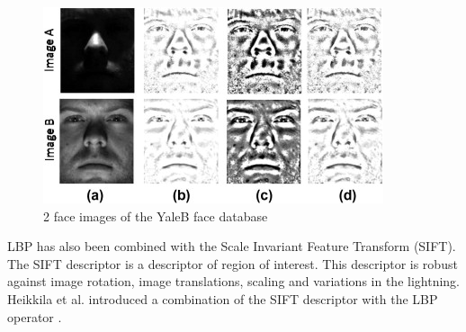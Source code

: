 \begin{figure}[!h]
\begin{center}
\noindent \includegraphics[scale=1]{figures/combination_lbp_gabor} 
\newline
\caption{2 face images of the YaleB face database}
\label{combination_lbp_gabor}
\end{center} 
\end{figure}

\noindent  LBP has also been combined with the Scale Invariant Feature Transform (SIFT). The SIFT descriptor is a descriptor of region of interest. This descriptor is robust against image rotation, image translations, scaling and variations in the lightning. Heikkila et al. introduced a combination of the SIFT descriptor with the LBP operator \cite{HEI09}.
\newline
